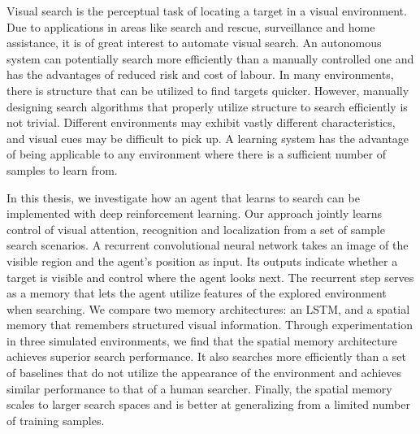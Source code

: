 Visual search is the perceptual task of locating a target in a visual environment.
Due to applications in areas like search and rescue, surveillance and home assistance, it is of great interest to automate visual search.
An autonomous system can potentially search more efficiently than a manually controlled one and has the advantages of reduced risk and cost of labour.
In many environments, there is structure that can be utilized to find targets quicker.
However, manually designing search algorithms that properly utilize structure to search efficiently is not trivial.
Different environments may exhibit vastly different characteristics, and visual cues may be difficult to pick up.
A learning system has the advantage of being applicable to any environment where there is a sufficient number of samples to learn from.

In this thesis, we investigate how an agent that learns to search can be implemented with deep reinforcement learning.
Our approach jointly learns control of visual attention, recognition and localization from a set of sample search scenarios.
A recurrent convolutional neural network takes an image of the visible region and the agent's position as input.
Its outputs indicate whether a target is visible and control where the agent looks next.
The recurrent step serves as a memory that lets the agent utilize features of the explored environment when searching.
We compare two memory architectures: an LSTM, and a spatial memory that remembers structured visual information.
Through experimentation in three simulated environments, we find that the spatial memory architecture achieves superior search performance.
It also searches more efficiently than a set of baselines that do not utilize the appearance of the environment and achieves similar performance to that of a human searcher.
Finally, the spatial memory scales to larger search spaces and is better at generalizing from a limited number of training samples.
